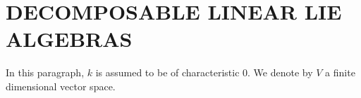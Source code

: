 \section{DECOMPOSABLE LINEAR LIE ALGEBRAS}

In this paragraph, \(k\) is assumed to be of characteristic 0. We denote by \(V\) a finite dimensional vector space.

